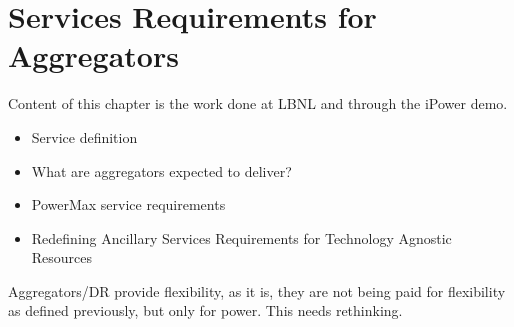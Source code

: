 \chapter{Services Requirements for Aggregators} %
\label{cha:services}
Content of this chapter is the work done at LBNL and through the iPower demo.
\begin{itemize}
	\item Service definition
	\item What are aggregators expected to deliver?
	\item PowerMax service requirements
	\item Redefining Ancillary Services Requirements for Technology Agnostic Resources
\end{itemize}

Aggregators/DR provide flexibility, as it is, they are not being paid for flexibility as defined previously, but only for power. This needs rethinking.

